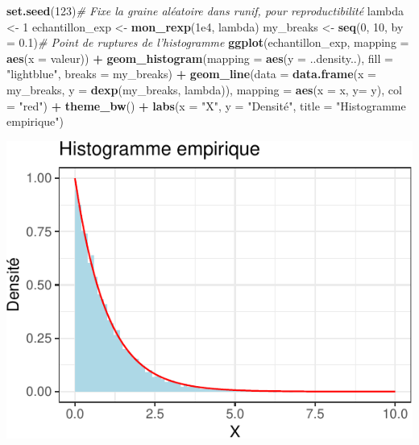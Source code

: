 \documentclass[]{article}
\newenvironment{Shaded}{\begin{snugshade}}{\end{snugshade}}
\newcommand{\CommentTok}[1]{\textcolor[rgb]{0.56,0.35,0.01}{\textit{#1}}}
\newcommand{\DataTypeTok}[1]{\textcolor[rgb]{0.13,0.29,0.53}{#1}}
\newcommand{\DecValTok}[1]{\textcolor[rgb]{0.00,0.00,0.81}{#1}}
\newcommand{\FloatTok}[1]{\textcolor[rgb]{0.00,0.00,0.81}{#1}}
\newcommand{\KeywordTok}[1]{\textcolor[rgb]{0.13,0.29,0.53}{\textbf{#1}}}
\newcommand{\NormalTok}[1]{#1}
\newcommand{\OperatorTok}[1]{\textcolor[rgb]{0.81,0.36,0.00}{\textbf{#1}}}
\newcommand{\StringTok}[1]{\textcolor[rgb]{0.31,0.60,0.02}{#1}}
\begin{document}
\begin{Shaded}
\begin{Highlighting}[]
\KeywordTok{set.seed}\NormalTok{(}\DecValTok{123}\NormalTok{)}\CommentTok{# Fixe la graine aléatoire dans runif, pour reproductibilité}
\NormalTok{lambda <-}\StringTok{ }\DecValTok{1}
\NormalTok{echantillon_exp <-}\StringTok{ }\KeywordTok{mon_rexp}\NormalTok{(}\FloatTok{1e4}\NormalTok{, lambda)}
\NormalTok{my_breaks <-}\StringTok{ }\KeywordTok{seq}\NormalTok{(}\DecValTok{0}\NormalTok{, }\DecValTok{10}\NormalTok{, }\DataTypeTok{by =} \FloatTok{0.1}\NormalTok{)}\CommentTok{# Point de ruptures de l'histogramme}
\KeywordTok{ggplot}\NormalTok{(echantillon_exp,  }\DataTypeTok{mapping =} \KeywordTok{aes}\NormalTok{(}\DataTypeTok{x =}\NormalTok{ valeur)) }\OperatorTok{+}
\StringTok{  }\KeywordTok{geom_histogram}\NormalTok{(}\DataTypeTok{mapping =} \KeywordTok{aes}\NormalTok{(}\DataTypeTok{y =}\NormalTok{ ..density..), }\DataTypeTok{fill =} \StringTok{"lightblue"}\NormalTok{,}
                 \DataTypeTok{breaks =}\NormalTok{ my_breaks) }\OperatorTok{+}
\StringTok{  }\KeywordTok{geom_line}\NormalTok{(}\DataTypeTok{data =} \KeywordTok{data.frame}\NormalTok{(}\DataTypeTok{x =}\NormalTok{ my_breaks, }\DataTypeTok{y =} \KeywordTok{dexp}\NormalTok{(my_breaks, lambda)),}
            \DataTypeTok{mapping =} \KeywordTok{aes}\NormalTok{(}\DataTypeTok{x =}\NormalTok{ x, }\DataTypeTok{y=}\NormalTok{ y), }\DataTypeTok{col =} \StringTok{"red"}\NormalTok{) }\OperatorTok{+}
\StringTok{  }\KeywordTok{theme_bw}\NormalTok{() }\OperatorTok{+}\StringTok{ }\KeywordTok{labs}\NormalTok{(}\DataTypeTok{x =} \StringTok{"X"}\NormalTok{, }\DataTypeTok{y =} \StringTok{"Densité"}\NormalTok{, }\DataTypeTok{title =} \StringTok{"Histogramme empirique"}\NormalTok{)}
\end{Highlighting}
\end{Shaded}

\begin{center}\includegraphics{correction_simulation_variables_aleatoires_files/figure-latex/plot_echantillon_mon_rexp-1} \end{center}
\end{document}
